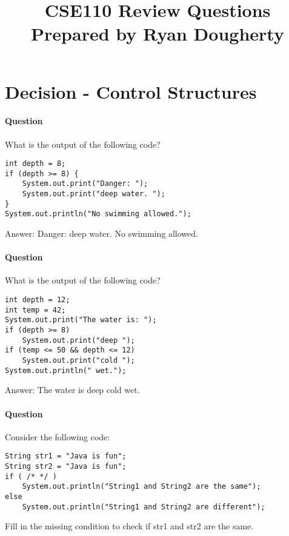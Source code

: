 \documentclass{article}
\date{}
\begin{document}
\title{\textbf{CSE110 Review Questions \\
Prepared by Ryan Dougherty}}
\maketitle

\section*{Decision - Control Structures}


\setcounter{question_num}{1}
\paragraph{Question }
What is the output of the following code?
\begin{lstlisting}
int depth = 8;
if (depth >= 8) {
	System.out.print("Danger: ");
	System.out.print("deep water. ");
}
System.out.println("No swimming allowed.");
\end{lstlisting}
{\color{red}Answer: Danger: deep water. No swimming allowed.}

\addtocounter{question_num}{1}
\paragraph{Question }
What is the output of the following code?
\begin{lstlisting}
int depth = 12;
int temp = 42;
System.out.print("The water is: ");
if (depth >= 8)
	System.out.print("deep ");
if (temp <= 50 && depth <= 12)
	System.out.print("cold ");
System.out.println(" wet.");
\end{lstlisting}
{\color{red}Answer: The water is deep cold wet.}

\addtocounter{question_num}{1}
\paragraph{Question }
Consider the following code:
\begin{lstlisting}
String str1 = "Java is fun";
String str2 = "Java is fun";
if ( /* */ )
	System.out.println("String1 and String2 are the same");
else
	System.out.println("String1 and String2 are different");
\end{lstlisting}
Fill in the missing condition to check if str1 and str2 are the same.
\end{document}
